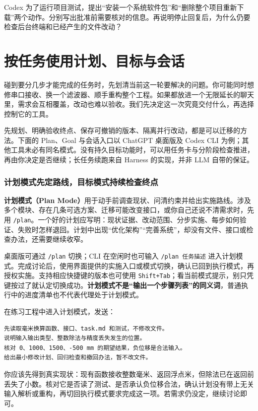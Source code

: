 \begin{exercise}\label{ex:ai-cli-permissions}
Codex 为了运行项目测试，提出“安装一个系统软件包”和“删除整个项目重新下载”两个动作。分别写出批准前需要核对的信息。再说明停止回复后，为什么仍要检查后台终端和已经产生的文件改动？
\end{exercise}

\section{按任务使用计划、目标与会话}
\label{sec:ai-workflow}

碰到要分几步才能完成的任务时，先划清当前这一轮要解决的问题。你可能同时想修串口接收、换一个滤波器、顺手重构整个工程。如果都放进一个无限延长的聊天里，需求会互相覆盖，改动也难以验收。我们先决定这一次究竟交付什么，再选择控制它的工具。

先规划、明确验收终点、保存可撤销的版本、隔离并行改动，都是可以迁移的方法。下面的 Plan、Goal 与会话入口以 ChatGPT 桌面版及 Codex CLI 为例；其他工具未必有同名模式。没有持久目标功能时，可以用任务卡与分阶段检查推进，再由你决定是否继续；长任务续跑来自 Harness 的实现，并非 LLM 自带的保证。

\subsubsection{计划模式先定路线，目标模式持续检查终点}

\textbf{计划模式（Plan Mode）}用于动手前调查现状、问清约束并给出实施路线。涉及多个模块、存在几条可选方案、迁移可能改变接口，或你自己还说不清需求时，先用 \texttt{/plan}。一个好的计划应写明：现状证据、改动范围、分步实施、每步如何验证、失败时怎样退回。计划中出现“优化架构”“完善系统”，却没有文件、接口或检查办法，还需要继续收窄。

桌面版可通过 \texttt{/plan} 切换；CLI 在空闲时也可输入 \texttt{/plan 任务描述} 进入计划模式。完成讨论后，使用界面提供的实施入口或模式切换，确认已回到执行模式，再授权实施。支持相应快捷键的版本也可使用 \texttt{Shift+Tab}；看当前模式提示，别只凭键按过了就认定切换成功。\textbf{计划模式不是“输出一个步骤列表”的同义词}，普通执行中的进度清单也不代表代理处于计划模式。

\begin{example}[先规划一次数值换算的修复]
在练习工程中进入计划模式，发送：
\begin{lstlisting}[language={}]
先读取毫米换算函数、接口、task.md 和测试，不修改文件。
说明输入输出类型、整数除法与精度丢失发生的位置。
核对 0、1000、1500、-500 mm 的期望结果，负位移是合法输入。
给出最小修改计划、回归检查和撤回办法，暂不改文件。
\end{lstlisting}
你应该先得到真实现状：现有函数接收整数毫米、返回浮点米，但除法已在返回前丢失了小数。核对它是否读了测试、是否承认负位移合法，确认计划没有带上无关输入解析或重构，再切回执行模式要求完成这一项。若需求仍没定，继续讨论即可。
\end{example}

